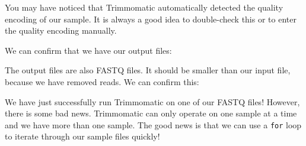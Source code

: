 \documentclass[
  letterpaper,
  DIV=11,
  numbers=noendperiod]{scrreprt}
\newenvironment{Shaded}{\begin{snugshade}}{\end{snugshade}}
\newcommand{\AttributeTok}[1]{\textcolor[rgb]{0.40,0.45,0.13}{#1}}
\newcommand{\ExtensionTok}[1]{\textcolor[rgb]{0.00,0.23,0.31}{#1}}
\newcommand{\NormalTok}[1]{\textcolor[rgb]{0.00,0.23,0.31}{#1}}
\newcommand{\PreprocessorTok}[1]{\textcolor[rgb]{0.68,0.00,0.00}{#1}}
\newcommand{\SpecialStringTok}[1]{\textcolor[rgb]{0.13,0.47,0.30}{#1}}
\begin{document}
You may have noticed that Trimmomatic automatically detected the quality
encoding of our sample. It is always a good idea to double-check this or
to enter the quality encoding manually.

We can confirm that we have our output files:

\begin{Shaded}
\end{Shaded}

The output files are also FASTQ files. It should be smaller than our
input file, because we have removed reads. We can confirm this:

\begin{Shaded}
\end{Shaded}

We have just successfully run Trimmomatic on one of our FASTQ files!
However, there is some bad news. Trimmomatic can only operate on one
sample at a time and we have more than one sample. The good news is that
we can use a \texttt{for} loop to iterate through our sample files
quickly!
\end{document}
